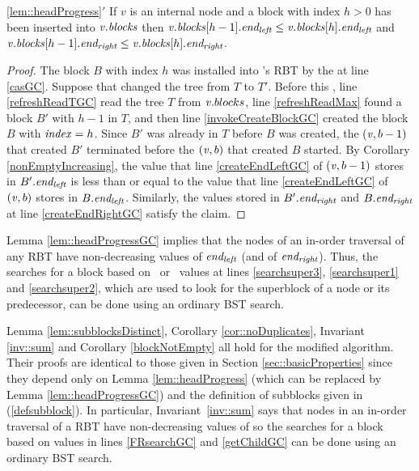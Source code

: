 \begin{customlemma}{\ref{lem::headProgress}$'$}\label{lem::headProgressGC}
 If $v$ is an internal node and a block with index $h>0$ has been inserted into $\mbox{\textnormal{\textit{v}}}.\mbox{\textit{blocks}}$ then 
 $\mbox{\textnormal{\textit{v}}}.\mbox{\textit{blocks}}[h-1].\mbox{\textit{end\textsubscript{left}}} \leq \mbox{\textnormal{\textit{v}}}.\mbox{\textit{blocks}}[h].\mbox{\textit{end\textsubscript{left}}}$ and 
 $\mbox{\textnormal{\textit{v}}}.\mbox{\textit{blocks}}[h-1].\mbox{\textit{end\textsubscript{right}}} \leq \mbox{\textnormal{\textit{v}}}.\mbox{\textit{blocks}}[h].\mbox{\textit{end\textsubscript{right}}}$.
\end{customlemma}
\begin{proof}
The block $B$ with index $h$ was installed into 's RBT by the  at line \ref{casGC}.
Suppose that  changed the tree from $T$ to $T'$.
Before this , line \ref{refreshReadTGC} read the tree $T$ from $\mbox{\textnormal{\textit{v}}}.blocks$,
line \ref{refreshReadMax} found a block $B'$  with  $h-1$ in $T$,
and then line \ref{invokeCreateBlockGC} created the block $B$ with $\mbox{\textit{index}}=h$.
Since $B'$ was already in $T$ before $B$ was created, the
$(\mbox{\textnormal{\textit{v}}},b-1)$ that created $B'$ terminated before the 
$(\mbox{\textnormal{\textit{v}}},b)$ that created $B$ started.
By Corollary \ref{nonEmptyIncreasing}, the value that line \ref{createEndLeftGC} of $(\mbox{\textnormal{\textit{v}}},b-1)$ 
stores in $B'.\mbox{\textit{end\textsubscript{left}}}$ is less than or equal to the value that line \ref{createEndLeftGC} 
of $(\mbox{\textnormal{\textit{v}}},b)$ stores in $B.\mbox{\textit{end\textsubscript{left}}}$.  
Similarly, the values stored in $B'.\mbox{\textit{end\textsubscript{right}}}$ and $B.\mbox{\textit{end\textsubscript{right}}}$ at line \ref{createEndRightGC} satisfy the claim.
\end{proof}

Lemma \ref{lem::headProgressGC} implies that 
the nodes of an in-order traversal of any RBT have non-decreasing values of
$\mbox{\textit{end\textsubscript{left}}}$ (and of $\mbox{\textit{end\textsubscript{right}}}$).
Thus, the searches for a block based on \eleft\ or \eright\ values 
at lines \ref{searchsuper3}, \ref{searchsuper1} and \ref{searchsuper2},
which are used to look for the superblock of a node or its predecessor, can be done 
using an ordinary BST search.

Lemma \ref{lem::subblocksDistinct}, Corollary \ref{cor::noDuplicates}, Invariant \ref{inv::sum} and Corollary \ref{blockNotEmpty} all 
hold for the modified algorithm.  Their proofs are identical to those given in 
Section \ref{sec::basicProperties} since they  depend only on Lemma \ref{lem::headProgress} (which can be replaced by Lemma \ref{lem::headProgressGC})
and the definition of subblocks given in (\ref{defsubblock}).
In particular, Invariant~\ref{inv::sum} says that nodes in an in-order traversal of a RBT have non-decreasing
values of   so the searches for a block based on
 values in lines
\ref{FRsearchGC} and \ref{getChildGC} can be done using an ordinary BST search.

